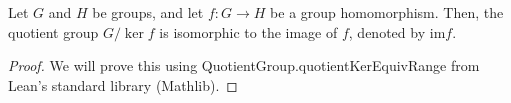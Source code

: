 \begin{theorem}
  \leanok
  Let $G$ and $H$ be groups, and let $f: G \to H$ be a group homomorphism.
  Then, the quotient group $G/\ker f$ is isomorphic to the image of $f$, denoted by $\mathrm{im} f$.
\end{theorem}

\begin{proof}
  \leanok
  We will prove this using QuotientGroup.quotientKerEquivRange from Lean's standard library (Mathlib).
\end{proof}
